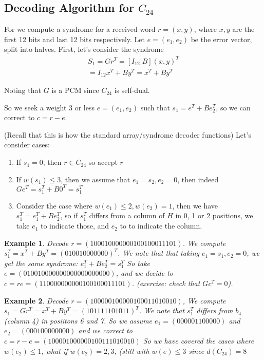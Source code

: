 \documentclass{article}
\newtheorem{eg}{Example}
\begin{document}
\subsection{Decoding Algorithm for $C_{24}$}
For we compute a syndrome for a received word $r = (x,y)$, where $x,y$ are the
first 12 bits and last 12 bits respectively. Let $e = (e_1, e_2)$ be the error
vector, split into halves. First, let's consider the syndrome
\begin{align*}
    S_1 = Gr^T = [I_{12} | B](x,y)^T\\
    = I_{12}x^T + By^T = x^T + By^T
\end{align*}

Noting that $G$ is a PCM since $C_{24}$ is self-dual.

So we seek a weight 3 or less $e = (e_1, e_2)$ such that
$s_1 = e^T + Be_2^T$, so we can correct to $c = r - e$.

(Recall that this is how the standard array/syndrome decoder functions)
Let's consider cases:
\begin{enumerate}
    \item If $s_1 = 0$, then $r\in C_{24}$ so accept $r$
    \item If $w(s_1) \leq 3$, then we assume that $e_1 = s_2, e_2 = 0$, then
        indeed $Ge^T = s_1^T + B0^T = s_1^T$
    \item Consider the case where $w(e_1)\leq 2, w(e_2) = 1$, then we have
        $s_1^T = e_1^T + Be_2^T$, so if $s_1^T$ differs from a column of $H$
        in 0, 1 or 2 positions, we take $e_1$ to indicate those, and $e_2$ to
        to indicate the column.
\end{enumerate}

\begin{eg}
    Decode $r = (1000 1000 0000 1001 0001 1101)$. We compute
    $s_1^T = x^T + By^T = (0100 1000 0000)^T$. We note that that
    taking $e_1 = s_1, e_2 =0$, we get the same syndrome:
    $e_1^T + Be_2^T = s_1^T$
    So take
    $e = (0100 1000 0000 0000 0000 0000)$, and we decide to
    $c = re = (1100 0000 0000 1001 0001 1101)$.
    (exercise: check that $Gc^T = 0$).
\end{eg}

\begin{eg}
    Decode $r = (1000 0010 0000 1000 1101 0010)$, We compute
    $s_1 = Gr^T = x^T + By^T = (1011 1110 1011)^T$. We note that
    $s_1^T$ differs from $b_4$ (column 4)  in posiitons 6 and 7. So
    we assume $e_1 = (0000 0110 0000)$ and $e_2 = (0001 0000 0000)$
    and we correct to $c = r - e = (1000 0100 0000 1001 1101 0010)$
    So we have covered the cases where $w(e_2) \leq 1$, what if
    $w(e_2) = 2, 3$, (still with $w(e) \leq 3$ since $d(C_{24}) = 8$
\end{eg}
\end{document}
